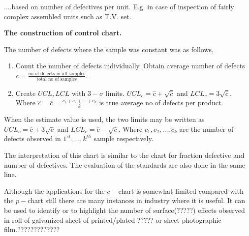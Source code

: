 \documentclass[oneside,11pt,pdftex]{book}%
\numberwithin{equation}{section}
\numberwithin{section}{chapter}
\numberwithin{equation}{chapter}
\begin{document}
....based on number of defectives per unit. E.g. in case of inspection of fairly complex assembled units such as T.V. set.

\textbf{The construction of control chart.}

The number of defects where the sample was constant was as follows,

\begin{enumerate}
	\item Count the number of defects individually. Obtain average number of defects $ \overline{c} = \frac{\text{no of defects in all samples}}{\text{total no of samples}}$.
	\item Create $ UCL, LCL $ with $ 3-\sigma  $ limits. $ UCL_c=\hat{c} + \sqrt{\hat{c}} $ and $ LCL_c= 3 \sqrt{\hat{c}}$. Where $ \hat{c} =\overline{c}=\frac{c_1+c_2+\cdots+c_k}{k}$ is true average no of defects per product.
\end{enumerate}

When the estimate value is used, the two limits may be written as $ UCL_c=\overline{c} + 3 \sqrt{\overline{c}}$ and $ LCL_c=\overline{c} - \sqrt{\overline{c}}$. Where $ c_1,c_2,\dots,c_k $ are the number of defects observed in $ 1^{st}, \dots, k^{th}$ sample respectively.


The interpretation of this chart is similar to the chart for fraction defective and number of defectives. The evaluation of the standards are also done in the same line.

Although the applications for the $ c- $chart is somewhat limited compared with the $ p- $chart still there are many instances in industry where it is useful. It can be used to identify or to highlight the number of surface(?????) effects observed in roll of galvanized sheet of printed/plated ????? or sheet photographic film.?????????????
\end{document}
